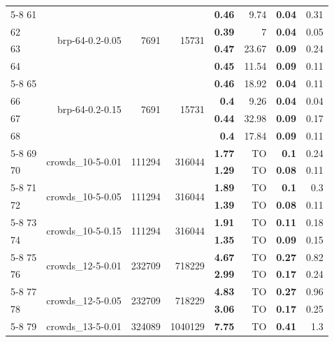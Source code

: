 \begin{longtable}{lrr@{\hskip 12pt}r@{\hskip 12pt}r@{\hskip 12pt}r@{\hskip 12pt}r@{\hskip 12pt}r}
\cmidrule{5-8}
61 & \multirow{4}{*}{brp-64-0.2-0.05} & \multirow{4}{*}{7691} & \multirow{4}{*}{15731} & \textbf{0.46} & 9.74 & \textbf{0.04} & 0.31 \\
62 &  &  &  & \textbf{0.39} & 7 & \textbf{0.04} & 0.05 \\
63 &  &  &  & \textbf{0.47} & 23.67 & \textbf{0.09} & 0.24 \\
64 &  &  &  & \textbf{0.45} & 11.54 & \textbf{0.09} & 0.11 \\
\cmidrule{5-8}
65 & \multirow{4}{*}{brp-64-0.2-0.15} & \multirow{4}{*}{7691} & \multirow{4}{*}{15731} & \textbf{0.46} & 18.92 & \textbf{0.04} & 0.11 \\
66 &  &  &  & \textbf{0.4} & 9.26 & \textbf{0.04} & 0.04 \\
67 &  &  &  & \textbf{0.44} & 32.98 & \textbf{0.09} & 0.17 \\
68 &  &  &  & \textbf{0.4} & 17.84 & \textbf{0.09} & 0.11 \\
\cmidrule{5-8}
69 & \multirow{2}{*}{crowds\_10-5-0.01} & \multirow{2}{*}{111294} & \multirow{2}{*}{316044} & \textbf{1.77} & TO & \textbf{0.1} & 0.24 \\
70 &  &  &  & \textbf{1.29} & TO & \textbf{0.08} & 0.11 \\
\cmidrule{5-8}
71 & \multirow{2}{*}{crowds\_10-5-0.05} & \multirow{2}{*}{111294} & \multirow{2}{*}{316044} & \textbf{1.89} & TO & \textbf{0.1} & 0.3 \\
72 &  &  &  & \textbf{1.39} & TO & \textbf{0.08} & 0.11 \\
\cmidrule{5-8}
73 & \multirow{2}{*}{crowds\_10-5-0.15} & \multirow{2}{*}{111294} & \multirow{2}{*}{316044} & \textbf{1.91} & TO & \textbf{0.11} & 0.18 \\
74 &  &  &  & \textbf{1.35} & TO & \textbf{0.09} & 0.15 \\
\cmidrule{5-8}
75 & \multirow{2}{*}{crowds\_12-5-0.01} & \multirow{2}{*}{232709} & \multirow{2}{*}{718229} & \textbf{4.67} & TO & \textbf{0.27} & 0.82 \\
76 &  &  &  & \textbf{2.99} & TO & \textbf{0.17} & 0.24 \\
\cmidrule{5-8}
77 & \multirow{2}{*}{crowds\_12-5-0.05} & \multirow{2}{*}{232709} & \multirow{2}{*}{718229} & \textbf{4.83} & TO & \textbf{0.27} & 0.96 \\
78 &  &  &  & \textbf{3.06} & TO & \textbf{0.17} & 0.25 \\
\cmidrule{5-8}
79 & \multirow{2}{*}{crowds\_13-5-0.01} & \multirow{2}{*}{324089} & \multirow{2}{*}{1040129} & \textbf{7.75} & TO & \textbf{0.41} & 1.3 \\

\end{longtable}
